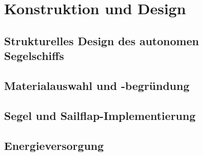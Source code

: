

\chapter{Konstruktion und Design}
\label{chap:konstruktion}


\section{Strukturelles Design des autonomen Segelschiffs}
\section{Materialauswahl und -begründung }
\section{Segel und Sailflap-Implementierung }
\section{Energieversorgung}